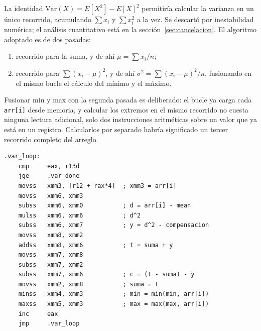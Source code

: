 \documentclass[journal]{IEEEtran}
\begin{document}
La identidad $\mathrm{Var}(X) = E[X^2] - E[X]^2$ permitiría calcular la
varianza en un único recorrido, acumulando $\sum x_i$ y $\sum x_i^2$ a
la vez. Se descartó por inestabilidad numérica; el análisis
cuantitativo está en la sección~\ref{sec:cancelacion}. El algoritmo
adoptado es de dos pasadas:

\begin{enumerate}
  \item recorrido para la suma, y de ahí $\mu = \sum x_i / n$;
  \item recorrido para $\sum (x_i - \mu)^2$, y de ahí
        $\sigma^2 = \sum (x_i-\mu)^2 / n$, fusionando en el mismo bucle
        el cálculo del mínimo y el máximo.
\end{enumerate}

Fusionar min y max con la segunda pasada es deliberado: el bucle ya carga
cada \texttt{arr[i]} desde memoria, y calcular los extremos en el mismo
recorrido no cuesta ninguna lectura adicional, solo dos instrucciones
aritméticas sobre un valor que ya está en un registro. Calcularlos por
separado habría significado un tercer recorrido completo del arreglo.

\begin{lstlisting}[caption={Bucle de varianza con mínimo y máximo
  fusionados y suma compensada de Kahan.}, label={lst:esc-var}]
.var_loop:
    cmp     eax, r13d
    jge     .var_done
    movss   xmm3, [r12 + rax*4]  ; xmm3 = arr[i]
    movss   xmm6, xmm3
    subss   xmm6, xmm0           ; d = arr[i] - mean
    mulss   xmm6, xmm6           ; d^2
    subss   xmm6, xmm7           ; y = d^2 - compensacion
    movss   xmm8, xmm2
    addss   xmm8, xmm6           ; t = suma + y
    movss   xmm7, xmm8
    subss   xmm7, xmm2
    subss   xmm7, xmm6           ; c = (t - suma) - y
    movss   xmm2, xmm8           ; suma = t
    minss   xmm4, xmm3           ; min = min(min, arr[i])
    maxss   xmm5, xmm3           ; max = max(max, arr[i])
    inc     eax
    jmp     .var_loop
\end{lstlisting}
\end{document}
